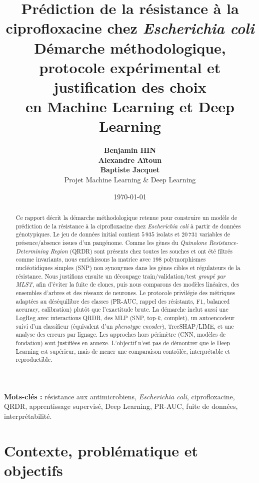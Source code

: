 \documentclass[11pt,a4paper]{article}
\title{
    \vspace{-1.2cm}
    \textbf{\LARGE Prédiction de la résistance à la ciprofloxacine chez \textit{Escherichia coli}}\\[0.35cm]
    \large Démarche méthodologique, protocole expérimental et justification des choix\\
    en Machine Learning et Deep Learning
}
\author{
    \textbf{Benjamin HIN}\\
    \textbf{Alexandre Aïtoun}\\
    \textbf{Baptiste Jacquet}\\
    Projet Machine Learning \& Deep Learning
}
\date{\today}
\begin{document}
\maketitle
\thispagestyle{empty}

\begin{abstract}
Ce rapport décrit la démarche méthodologique retenue pour construire un modèle de prédiction de la résistance à la ciprofloxacine chez \textit{Escherichia coli} à partir de données génotypiques. Le jeu de données initial contient $5\,935$ isolats et $20\,731$ variables de présence/absence issues d'un pangénome. Comme les gènes du \textit{Quinolone Resistance-Determining Region} (QRDR) sont présents chez toutes les souches et ont été filtrés comme invariants, nous enrichissons la matrice avec $198$ polymorphismes nucléotidiques simples (SNP) non synonymes dans les gènes cibles et régulateurs de la résistance. Nous justifions ensuite un découpage train/validation/test \emph{groupé par MLST}, afin d'éviter la fuite de clones, puis nous comparons des modèles linéaires, des ensembles d'arbres et des réseaux de neurones. Le protocole privilégie des métriques adaptées au déséquilibre des classes (PR-AUC, rappel des résistants, F1, balanced accuracy, calibration) plutôt que l'exactitude brute. La démarche inclut aussi une LogReg avec interactions QRDR, des MLP (SNP, top-$k$, complet), un autoencodeur suivi d'un classifieur (équivalent d'un \emph{phenotype encoder}), TreeSHAP/LIME, et une analyse des erreurs par lignage. Les approches hors périmètre (CNN, modèles de fondation) sont justifiées en annexe. L'objectif n'est pas de démontrer que le Deep Learning est supérieur, mais de mener une comparaison contrôlée, interprétable et reproductible.
\end{abstract}

\vspace{0.3cm}
\noindent\textbf{Mots-clés :} résistance aux antimicrobiens, \textit{Escherichia coli}, ciprofloxacine, QRDR, apprentissage supervisé, Deep Learning, PR-AUC, fuite de données, interprétabilité.

\tableofcontents
\newpage

\section{Contexte, problématique et objectifs}
\end{document}
